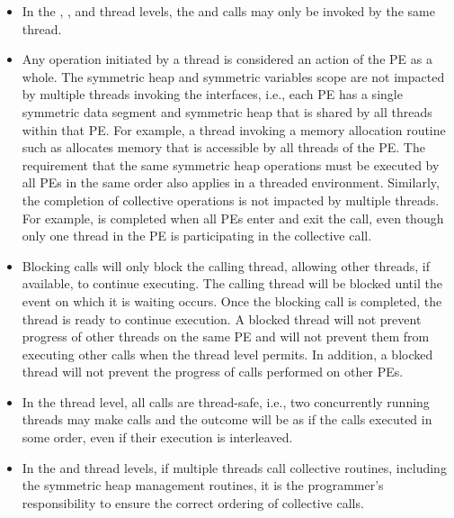 \begin{itemize}
\item
In the , , and
 thread levels, the  and
 calls may only be invoked by the same thread.

\item
Any \openshmem operation initiated by a thread is considered an action of the
\ac{PE} as a whole. The symmetric heap and symmetric variables scope are not
impacted by multiple threads invoking the \openshmem interfaces, i.e.,
each \ac{PE} has a single symmetric data segment and symmetric heap that is shared by
all threads within that \ac{PE}.  For example, a thread invoking a memory allocation
routine such as  allocates memory that is accessible by
all threads of the \ac{PE}. The requirement that the same symmetric heap operations
must be executed by all \acp{PE} in the same order also applies in a threaded
environment. Similarly, the completion of collective operations is not impacted
by multiple threads. For example,  is completed when
all \acp{PE} enter and exit the  call, even though
only one thread in the \ac{PE} is participating in the collective call.

\item Blocking \openshmem calls will only block the calling thread, allowing
other threads, if available, to continue executing. The calling thread will
be blocked until the event on which it is waiting occurs. Once the blocking call is
completed, the thread is ready to continue execution. A blocked thread
will not prevent progress of other threads on the same \ac{PE} and will not
prevent them from executing other \openshmem calls when the thread level permits.
In addition, a blocked thread will not prevent the progress of \openshmem calls
performed on other \acp{PE}.

\item In the  thread level, all \openshmem calls are thread-safe,
i.e., two concurrently running threads may make \openshmem calls and the outcome
will be as if the calls executed in some order, even if their execution is interleaved.

\item In the  and  thread levels,
if multiple threads call collective routines, including the symmetric heap
management routines, it is the programmer's responsibility to ensure the
correct ordering of collective calls.

\end{itemize}

